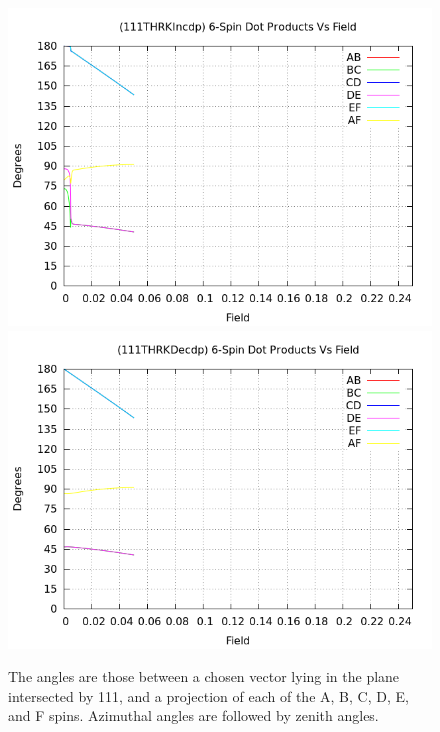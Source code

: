 \documentclass{article}
\begin{document}
\begin{figure}
\centering
\includegraphics[scale=0.27]{HVariedData/Pictures/111THRKIncdp.png}
\includegraphics[scale=0.27]{HVariedData/Pictures/111THRKDecdp.png}
\caption{The angles are those between a chosen vector lying in the plane intersected by 111,
and a projection of each of the A, B, C, D, E, and F  spins. Azimuthal angles are followed by zenith angles.}
\end{figure}
\pagebreak
\end{document}
